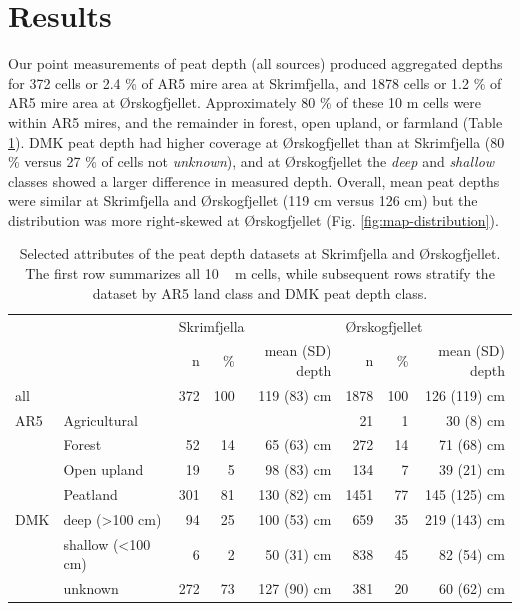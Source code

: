 \documentclass[soil, manuscript]{copernicus}
\begin{document}
\section{Results}

Our point measurements of peat depth (all sources) produced aggregated depths for 372 cells or 2.4 \% of AR5 mire area at Skrimfjella, and 1878 cells or 1.2 \% of AR5 mire area at Ørskogfjellet.
Approximately 80 \% of these 10 m cells were within AR5 mires, and the remainder in forest, open upland, or farmland (Table \ref{tab:depthsByClass}).
DMK peat depth had higher coverage at Ørskogfjellet than at Skrimfjella (80 \% versus 27 \% of cells not \emph{unknown}), and at Ørskogfjellet the \emph{deep} and \emph{shallow} classes showed a larger difference in measured depth.
Overall, mean peat depths were similar at Skrimfjella and Ørskogfjellet (119 cm versus 126 cm) but the distribution was more right-skewed at Ørskogfjellet (Fig. \ref{fig:map-distribution}).

\begin{table}[ht]
\caption{Selected attributes of the peat depth datasets at Skrimfjella and Ørskogfjellet. The first row summarizes all \unit{10\,m} cells, while subsequent rows stratify the dataset by AR5 land class and DMK peat depth class.}
\begin{tabular}{llrrr@{\hspace{5em}}rrr}
\hline
    &                             & \multicolumn{3}{l}{Skrimfjella} & \multicolumn{3}{l}{Ørskogfjellet} \\ \cline{3-5} \cline{6-8}
    &                             & n     & \%   & mean (SD) depth  & n      & \%    & mean (SD) depth  \\ \hline 
all &                             & 372   & 100  & 119 (83) cm      & 1878   & 100   & 126 (119) cm     \\
AR5 & Agricultural                &       &      &                  & 21     & 1     & 30 (8) cm        \\
    & Forest                      & 52    & 14   & 65 (63) cm       & 272    & 14    & 71 (68) cm       \\
    & Open upland                 & 19    & 5    & 98 (83) cm       & 134    & 7     & 39 (21) cm       \\
    & Peatland                    & 301   & 81   & 130 (82) cm      & 1451   & 77    & 145 (125) cm     \\
DMK & deep (\textgreater{}100 cm) & 94    & 25   & 100 (53) cm      & 659    & 35    & 219 (143) cm     \\
    & shallow (\textless{}100 cm) & 6     & 2    & 50 (31) cm       & 838    & 45    & 82 (54) cm       \\
    & unknown                     & 272   & 73   & 127 (90) cm      & 381    & 20    & 60 (62) cm       \\ \hline
\end{tabular}
\label{tab:depthsByClass}
\end{table}
\end{document}
